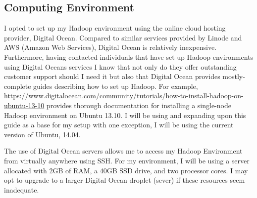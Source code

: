 \documentclass[twoside]{article}
\begin{document}
\begin{multicols}{2}
\section{Computing Environment}
I opted to set up my Hadoop environment using the online cloud hosting provider, Digital Ocean. Compared to similar services provided by Linode and AWS (Amazon Web Services), Digital Ocean is relatively inexpensive. Furthermore, having contacted individuals that have set up Hadoop environments using Digital Oceans services I know that not only do they offer outstanding customer support should I need it but also that Digital Ocean provides mostly-complete guides describing how to set up Hadoop. For example, \url{https://www.digitalocean.com/community/tutorials/how-to-install-hadoop-on-ubuntu-13-10} provides thorough documentation for installing a single-node Hadoop environment on Ubuntu 13.10. I will be using and expanding upon this guide as a base for my setup with one exception, I will be using the current version of Ubuntu, 14.04.

The use of Digital Ocean servers allows me to access my Hadoop Environment from virtually anywhere using SSH. For my environment, I will be using a server allocated with 2GB of RAM, a 40GB SSD drive, and two processor cores. I may opt to upgrade to a larger Digital Ocean droplet (sever) if these resources seem inadequate.

\end{multicols}
\end{document}
